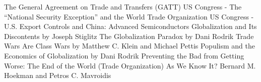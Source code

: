 
\begin{referencelist}
   The General Agreement on Trade and Transfers (GATT)
   US Congress - The “National Security Exception” and the World Trade Organization
   US Congress - U.S. Export Controls and China: Advanced Semiconductors
   Globalization and Its Discontents by Joseph Stiglitz
   The Globalization Paradox by Dani Rodrik
   Trade Wars Are Class Wars by Matthew C. Klein and Michael Pettis
   Populism and the Economics of Globalization by Dani Rodrik
   Preventing the Bad from Getting Worse: The End of the World (Trade Organization) As We Know It? Bernard M. Hoekman and Petros C. Mavroidis
\end{referencelist}
